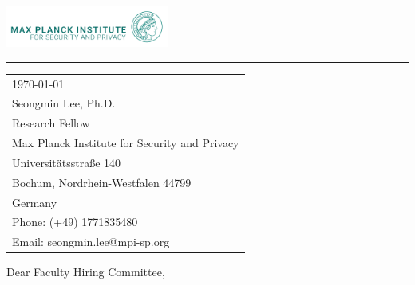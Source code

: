 \documentclass{article}
\begin{document}

\includegraphics[width=0.4\textwidth]{mpi.pdf}

\vspace{-1em} %

\rule{\linewidth}{1pt} %

\bigskip\bigskip %


\hfill
\begin{tabular}{l @{}}
	\today \bigskip\\ %
	Seongmin Lee, Ph.D. \\
	Research Fellow \\
	Max Planck Institute for Security and Privacy\\
    Universitätsstraße 140 \\
    Bochum, Nordrhein-Westfalen 44799 \\
    Germany \\ %
	Phone: (+49) 1771835480 \\
	Email: seongmin.lee@mpi-sp.org
\end{tabular}

\bigskip %


\bigskip %

Dear Faculty Hiring Committee,

\bigskip %

\end{document}
